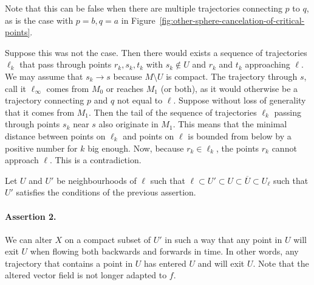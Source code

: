 \begin{myproof}
Note that this can be false when there are multiple trajectories connecting $p$ to $q$, as is the case with $p = b, q = a$ in Figure~\ref{fig:other-sphere-cancelation-of-critical-points}.
\begin{myproof}
    Suppose this was not the case.
    Then there would exists a sequence of trajectories $\ell_k$ that pass through points $r_k, s_k, t_k$ with $s_k \not\in U$ and $r_k$ and $t_k$ approaching $\ell$.
    We may assume that $s_k \to s$ because $M \setminus U$ is compact.
    The trajectory through $s$, call it $ \ell_\infty$ comes from  $ M_0$ or reaches $ M_1$ (or both), as it would otherwise be a trajectory connecting $p$ and $q$ not equal to $\ell$.
    Suppose without loss of generality that it comes from $M_1$.
    Then the tail of the sequence of trajectories $\ell_{k}$ passing through points $s_k$ near $s$ also originate in $M_1$.
    This means that the minimal distance between points on $\ell_{k}$ and points on $\ell$ is bounded from below by a positive number for $k$ big enough.
    Now, because $r_k \in \ell_k$, the points $r_k$ cannot approach  $\ell$. This is a contradiction.
\end{myproof}

Let $U$ and $U'$ be neighbourhoods of $\ell$ such that $\ell \subset U' \subset U \subset \overline{U} \subset U_\ell$ such that $U'$ satisfies the conditions of the previous assertion.

\paragraph{Assertion 2.}
We can alter $X$ on a compact subset of $U'$ in such a way that any point in $U$ will exit $U$ when flowing both backwards and forwards in time.
In other words, any trajectory that contains a point in $U$ has entered $U$  and will exit $U$.
Note that the altered vector field is not longer adapted to $f$.


\end{myproof}

